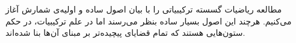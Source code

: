\p
مطالعه ریاضیات گسسته ترکیبیاتی را با بیان اصول ساده و اولیه‌ی شمارش آغاز می‌کنیم.
هرچند این اصول بسیار ساده بنظر می‌رسند اما در علم ترکیبیات، در حکم ستون‌هایی هستند
که تمام قضایای پیچیده‌تر بر مبنای آن‌ها بنا شده‌اند.







